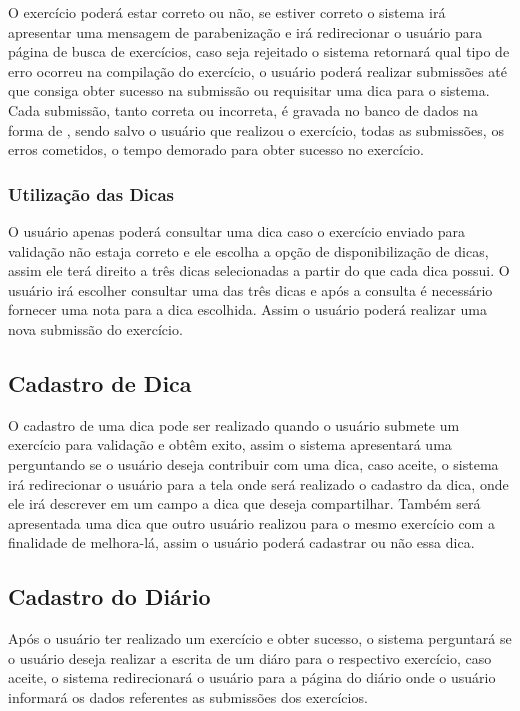 O exercício poderá estar correto ou não, se estiver correto o sistema irá apresentar uma mensagem de parabenização e irá redirecionar o usuário para página de busca de exercícios, caso seja rejeitado o sistema retornará qual tipo de erro ocorreu na compilação do exercício, o usuário poderá realizar submissões até que consiga obter sucesso na submissão ou requisitar uma dica para o sistema. Cada submissão, tanto correta ou incorreta, é gravada no banco de dados na forma de , sendo salvo o usuário que realizou o exercício, todas as submissões, os erros cometidos, o tempo demorado para obter sucesso no exercício.

\subsubsection{Utilização das Dicas}

O usuário apenas poderá consultar uma dica caso o exercício enviado para validação não estaja correto e ele escolha a opção de disponibilização de dicas, assim ele terá direito a três dicas selecionadas a partir do  que cada dica possui. O usuário irá escolher consultar uma das três dicas e após a consulta é necessário fornecer uma nota para a dica escolhida. Assim o usuário poderá realizar uma nova submissão do exercício.

\subsection{Cadastro de Dica}

O cadastro de uma dica pode ser realizado quando o usuário submete um exercício para validação e obtêm exito, assim o sistema apresentará uma  perguntando se o usuário deseja contribuir com uma dica, caso aceite, o sistema irá redirecionar o usuário para a tela onde será realizado o cadastro da dica, onde ele irá descrever em um campo a dica que deseja compartilhar. Também será apresentada uma dica que outro usuário realizou para o mesmo exercício com a finalidade de melhora-lá, assim o usuário poderá cadastrar ou não essa dica.

\subsection{Cadastro do Diário}

Após o usuário ter realizado um exercício e obter sucesso, o sistema perguntará se o usuário deseja realizar a escrita de um diáro para o respectivo exercício, caso aceite, o sistema redirecionará o usuário para a página do diário onde o usuário informará os dados referentes as submissões dos exercícios.


